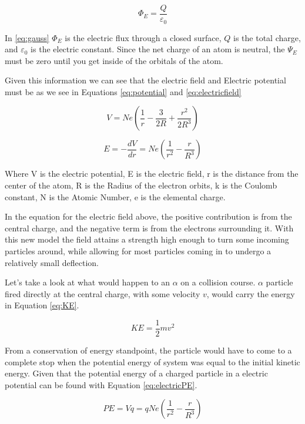 \documentclass[12pt]{article}
\begin{document}
\begin{equation}\label{eq:gauss}
    \Phi_E = \frac{Q}{\varepsilon_0}
\end{equation}

In \ref{eq:gauss} $\Phi_E$ is the electric flux through a closed surface, $Q$ is the total charge, and $\varepsilon_0$ is the electric constant. Since the net charge of an atom is neutral, the $\Psi_E$ must be zero until you get inside of the orbitals of the atom.

Given this information we can see that the electric field and Electric potential must be as we see in Equations \ref{eq:potential} and \ref{eq:electricfield}

\begin{equation}\label{eq:potential}
V = Ne(\frac{1}{r} - \frac{3}{2R} + \frac{r^2}{2R^3})
\end{equation}

\begin{equation}\label{eq:electricfield}
E = -\frac{dV}{dr} = Ne(\frac{1}{r^2} - \frac{r}{R^3})
\end{equation}

Where V is the electric potential, E is the electric field, r is the distance from the center of the atom, R is the Radius of the electron orbits, k is the Coulomb constant, N is the Atomic Number, e is the elemental charge.

In the equation for the electric field above, the positive contribution is from the central charge, and the negative term is from the electrons surrounding it.
With this new model the field attains a strength high enough to turn some incoming particles around, while allowing for most particles coming in to undergo a relatively small deflection.

Let's take a look at what would happen to an $\alpha$ on a collision course. $\alpha$ particle fired directly at the central charge, with some velocity $v$, would carry the energy in Equation \ref{eq:KE}.

\begin{equation}\label{eq:KE}
    KE = \frac{1}{2}mv^2
\end{equation}

From a conservation of energy standpoint, the particle would have to come to a complete stop when the potential energy of system was equal to the initial kinetic energy. Given that the potential energy of a charged particle in a electric potential can be found with Equation \ref{eq:electricPE}.

\begin{equation}\label{eq:electricPE}
    PE = Vq = qNe(\frac{1}{r^2} - \frac{r}{R^3})
\end{equation}
\end{document}
